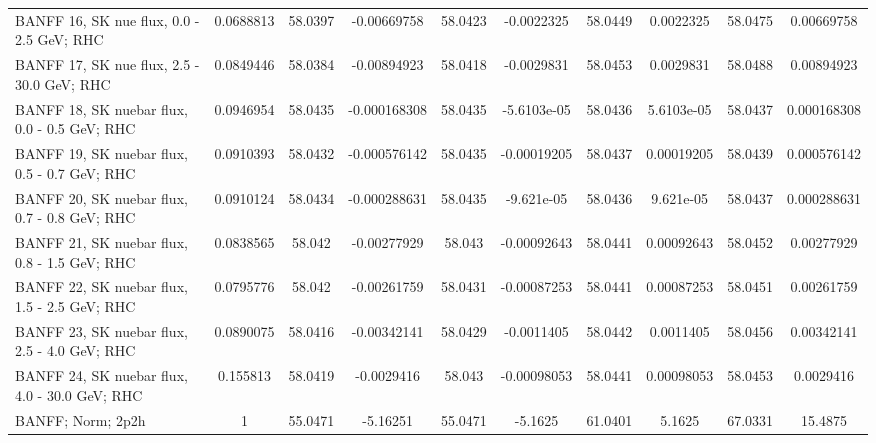 \begin{tabular}{| l | S | S  S | S  S | S  S | S  S | }
                                       BANFF 16, SK nue flux, 0.0 - 2.5 GeV; RHC &       0.0688813 &         58.0397 &     -0.00669758 &         58.0423 &      -0.0022325 &         58.0449 &       0.0022325 &         58.0475 &      0.00669758 \\ 
                                      BANFF 17, SK nue flux, 2.5 - 30.0 GeV; RHC &       0.0849446 &         58.0384 &     -0.00894923 &         58.0418 &      -0.0029831 &         58.0453 &       0.0029831 &         58.0488 &      0.00894923 \\ 
                                    BANFF 18, SK nuebar flux, 0.0 - 0.5 GeV; RHC &       0.0946954 &         58.0435 &    -0.000168308 &         58.0435 &     -5.6103e-05 &         58.0436 &      5.6103e-05 &         58.0437 &     0.000168308 \\ 
                                    BANFF 19, SK nuebar flux, 0.5 - 0.7 GeV; RHC &       0.0910393 &         58.0432 &    -0.000576142 &         58.0435 &     -0.00019205 &         58.0437 &      0.00019205 &         58.0439 &     0.000576142 \\ 
                                    BANFF 20, SK nuebar flux, 0.7 - 0.8 GeV; RHC &       0.0910124 &         58.0434 &    -0.000288631 &         58.0435 &      -9.621e-05 &         58.0436 &       9.621e-05 &         58.0437 &     0.000288631 \\ 
                                    BANFF 21, SK nuebar flux, 0.8 - 1.5 GeV; RHC &       0.0838565 &          58.042 &     -0.00277929 &          58.043 &     -0.00092643 &         58.0441 &      0.00092643 &         58.0452 &      0.00277929 \\ 
                                    BANFF 22, SK nuebar flux, 1.5 - 2.5 GeV; RHC &       0.0795776 &          58.042 &     -0.00261759 &         58.0431 &     -0.00087253 &         58.0441 &      0.00087253 &         58.0451 &      0.00261759 \\ 
                                    BANFF 23, SK nuebar flux, 2.5 - 4.0 GeV; RHC &       0.0890075 &         58.0416 &     -0.00342141 &         58.0429 &      -0.0011405 &         58.0442 &       0.0011405 &         58.0456 &      0.00342141 \\ 
                                   BANFF 24, SK nuebar flux, 4.0 - 30.0 GeV; RHC &        0.155813 &         58.0419 &      -0.0029416 &          58.043 &     -0.00098053 &         58.0441 &      0.00098053 &         58.0453 &       0.0029416 \\ 
                                                               BANFF; Norm; 2p2h &               1 &         55.0471 &        -5.16251 &         55.0471 &         -5.1625 &         61.0401 &          5.1625 &         67.0331 &         15.4875 \\ 

\end{tabular}
